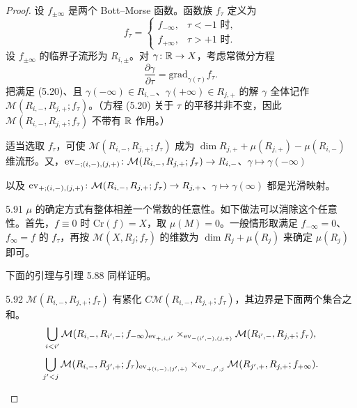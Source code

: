 \begin{proof}
  设 $f_{\pm\infty}$ 是两个 Bott–Morse 函数。函数族 $f_\tau$ 定义为
  \[
    f_\tau=
    \begin{cases}
      f_{-\infty}, & \tau<-1\text{ 时},\\
      f_{+\infty}, & \tau>+1\text{ 时}.
    \end{cases}
  \]
  设 $f_{\pm\infty}$ 的临界子流形为 $R_{i,\pm}$。对 $\gamma\colon\mathbb{R}\to X$，考虑常微分方程
  \begin{equation}
    \frac{\partial\gamma}{\partial\tau}=\mathrm{grad}_{\gamma(\tau)}f_\tau . \tag{5.20}
  \end{equation}
  把满足 (5.20)、且 $\gamma(-\infty)\in R_{i,-}$、$\gamma(+\infty)\in R_{j,+}$ 的解 $\gamma$ 全体记作 $\mathcal{M}(R_{i,-},R_{j,+};f_\tau)$。（方程 (5.20) 关于 $\tau$ 的平移并非不变，因此 $\mathcal{M}(R_{i,-},R_{j,+};f_\tau)$ 不带有 $\mathbb{R}$ 作用。）

  适当选取 $f_\tau$，可使 $\mathcal{M}(R_{i,-},R_{j,+};f_\tau)$ 成为 $\dim R_{j,+}+\mu(R_{j,+})-\mu(R_{i,-})$ 维流形。又，$\operatorname{ev}_{-;(i,-),(j,+)}\colon\mathcal{M}(R_{i,-},R_{j,+};f_\tau)\to R_{i,-}$、$\gamma\mapsto\gamma(-\infty)$

  以及 $\operatorname{ev}_{+;(i,-),(j,+)}\colon\mathcal{M}(R_{i,-},R_{j,+};f_\tau)\to R_{j,+}$、$\gamma\mapsto\gamma(\infty)$ 都是光滑映射。

\begin{remark}{5.91}
  $\mu$ 的确定方式有整体相差一个常数的任意性。如下做法可以消除这个任意性。首先，$f\equiv0$ 时 $\mathrm{Cr}(f)=X$，取 $\mu(M)=0$。一般情形取满足 $f_{-\infty}=0$、$f_\infty=f$ 的 $f_\tau$，再按 $\mathcal{M}(X,R_j;f_\tau)$ 的维数为 $\dim R_j+\mu(R_j)$ 来确定 $\mu(R_j)$ 即可。
\end{remark}

下面的引理与引理 5.88 同样证明。

\begin{lemma}{5.92}
  $\mathcal{M}(R_{i,-},R_{j,+};f_\tau)$ 有紧化 $C\mathcal{M}(R_{i,-},R_{j,+};f_\tau)$，其边界是下面两个集合之和。
  \[
    \bigcup_{i<i'}\mathcal{M}(R_{i,-},R_{i',-};f_{-\infty})_{\operatorname{ev}_{+,i,i'}}
    \times_{\operatorname{ev}_{-(i',-),(j,+)}}\mathcal{M}(R_{i',-},R_{j,+};f_\tau),
  \]
  \[
    \bigcup_{j'<j}\mathcal{M}(R_{i,-},R_{j',+};f_\tau)_{\operatorname{ev}_{+(i,-),(j',+)}}
    \times_{\operatorname{ev}_{-,j',j}}\mathcal{M}(R_{j',+},R_{j,+};f_{+\infty}).
  \]
\end{lemma}


\end{proof}
